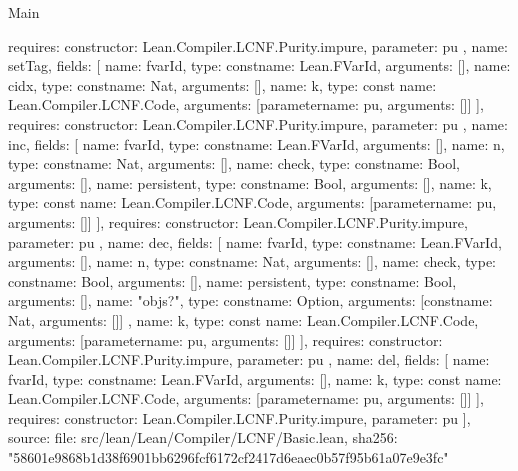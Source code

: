 \begin{lexlean}{Main}
\begin{toolingmodule}
{{{          requires: {constructor: Lean.Compiler.LCNF.Purity.impure, parameter: pu}
        },
        {
          name: setTag,
          fields: [
            {name: fvarId, type: const{name: Lean.FVarId, arguments: []}},
            {name: cidx, type: const{name: Nat, arguments: []}},
            {
              name: k,
              type: const{
                name: Lean.Compiler.LCNF.Code,
                arguments: [parameter{name: pu, arguments: []}]
              }
            }
          ],
          requires: {constructor: Lean.Compiler.LCNF.Purity.impure, parameter: pu}
        },
        {
          name: inc,
          fields: [
            {name: fvarId, type: const{name: Lean.FVarId, arguments: []}},
            {name: n, type: const{name: Nat, arguments: []}},
            {name: check, type: const{name: Bool, arguments: []}},
            {name: persistent, type: const{name: Bool, arguments: []}},
            {
              name: k,
              type: const{
                name: Lean.Compiler.LCNF.Code,
                arguments: [parameter{name: pu, arguments: []}]
              }
            }
          ],
          requires: {constructor: Lean.Compiler.LCNF.Purity.impure, parameter: pu}
        },
        {
          name: dec,
          fields: [
            {name: fvarId, type: const{name: Lean.FVarId, arguments: []}},
            {name: n, type: const{name: Nat, arguments: []}},
            {name: check, type: const{name: Bool, arguments: []}},
            {name: persistent, type: const{name: Bool, arguments: []}},
            {
              name: "objs?",
              type: const{name: Option, arguments: [const{name: Nat, arguments: []}]}
            },
            {
              name: k,
              type: const{
                name: Lean.Compiler.LCNF.Code,
                arguments: [parameter{name: pu, arguments: []}]
              }
            }
          ],
          requires: {constructor: Lean.Compiler.LCNF.Purity.impure, parameter: pu}
        },
        {
          name: del,
          fields: [
            {name: fvarId, type: const{name: Lean.FVarId, arguments: []}},
            {
              name: k,
              type: const{
                name: Lean.Compiler.LCNF.Code,
                arguments: [parameter{name: pu, arguments: []}]
              }
            }
          ],
          requires: {constructor: Lean.Compiler.LCNF.Purity.impure, parameter: pu}
        }
      ],
      source: {
        file: src/lean/Lean/Compiler/LCNF/Basic.lean,
        sha256: "58601e9868b1d38f6901bb6296fcf6172cf2417d6eaec0b57f95b61a07e9e3fc"
}}}
\end{toolingmodule}
\end{lexlean}
